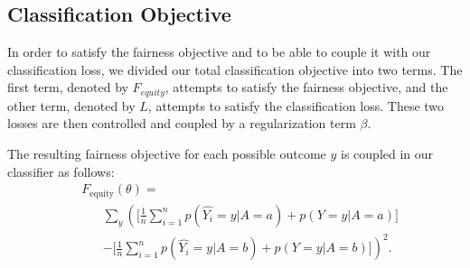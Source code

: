 \subsection{Classification Objective}
In order to satisfy the fairness objective %
and to be able to couple it with our classification loss, we divided our total classification objective into two terms. The first term, denoted by $F_{equity}$, attempts to satisfy the fairness objective, and the other term, denoted by $L$, attempts to satisfy the classification loss. These two losses are then controlled and coupled by a regularization term $\beta$.

The resulting fairness objective for each possible outcome $y$ is coupled in our classifier as follows:
 \begin{align*}
        &F_\text{equity}(\theta)=\\
        &\;\;\;\;\;\;\sum_{y}\left(\Big[\frac{1}{n}\sum_{i=1}^{n}p(\hat{Y_i}=y|A=a)
        +p(Y=y|A=a)\Big]\right. \\
        &\;\;\;\;\;\;\left. -\Big[\frac{1}{n}\sum_{i=1}^{n}p(\hat{Y_i}=y|A=b) 
        +p(Y=y|A=b)\Big]\right)^2.
\end{align*}

